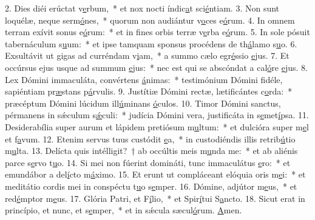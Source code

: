 2. Dies diéi erúctat v\uline{e}rbum,~* et nox nocti índic\uline{a}t sci\uline{é}ntiam.
3. Non sunt loquélæ, neque serm\uline{ó}nes,~* quorum non audiántur v\uline{o}ces e\uline{ó}rum.
4. In omnem terram exívit sonus e\uline{ó}rum:~* et in fines orbis terræ v\uline{e}rba e\uline{ó}rum.
5. In sole pósuit tabernáculum s\uline{u}um:~* et ipse tamquam sponsus procédens de th\uline{á}lamo s\uline{u}o.
6. Exsultávit ut gigas ad curréndam v\uline{i}am,~* a summo cælo egr\uline{é}ssio \uline{e}jus.
7. Et occúrsus ejus usque ad summum \uline{e}jus:~* nec est qui se abscóndat a cal\uline{ó}re \uline{e}jus.
8. Lex Dómini immaculáta, convértens \uline{á}nimas:~* testimónium Dómini fidéle, sapiéntiam pr\uline{æ}stans p\uline{á}rvulis.
9. Justítiæ Dómini rectæ, lætificántes c\uline{o}rda:~* præcéptum Dómini lúcidum ill\uline{ú}minans \uline{ó}culos.
10. Timor Dómini sanctus, pérmanens in sǽculum s\uline{ǽ}culi:~* judícia Dómini vera, justificáta in s\uline{e}met\uline{í}psa.
11. Desiderabília super aurum et lápidem pretiósum m\uline{u}ltum:~* et dulcióra super m\uline{e}l et f\uline{a}vum.
12. Etenim servus tuus custódit \uline{e}a,~* in custodiéndis illis retrib\uline{ú}tio m\uline{u}lta.
13. Delícta quis intélligit?~† ab occúltis meis m\uline{u}nda me:~* et ab aliénis parce s\uline{e}rvo t\uline{u}o.
14. Si mei non fúerint domináti, tunc immaculátus \uline{e}ro:~* et emundábor a del\uline{í}cto m\uline{á}ximo.
15. Et erunt ut compláceant elóquia oris m\uline{e}i:~* et meditátio cordis mei in conspéctu t\uline{u}o s\uline{e}mper.
16. Dómine, adjútor m\uline{e}us,~* et red\uline{é}mptor m\uline{e}us.
17. Glória Patri, et F\uline{í}lio,~* et Spir\uline{í}tui S\uline{a}ncto.
18. Sicut erat in princípio, et nunc, et s\uline{e}mper,~* et in sǽcula sæcul\uline{ó}rum. \uline{A}men.
